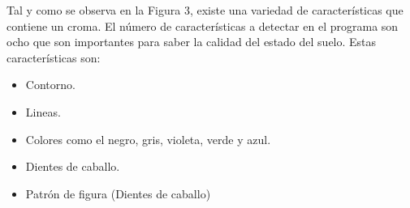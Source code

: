 Tal y como se observa en la Figura 3, existe una variedad de características que contiene un croma.
El número  de  características a detectar en el programa son ocho que son importantes para saber la calidad del estado del suelo.
Estas características son: 
\begin{itemize}
\item Contorno.
\item Lineas.
\item Colores como el negro, gris, violeta, verde y azul.
\item Dientes de caballo.
\item Patrón de figura (Dientes de caballo)
\end{itemize}


